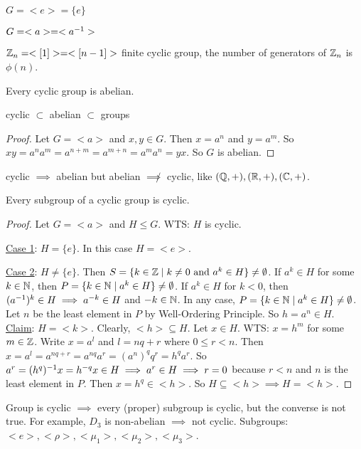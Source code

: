 \documentclass[]{article}
\begin{document}
\begin{example}
	$G = <e> = \{e\}$
\end{example}
\begin{remark}
	$G = <a> = <a^{-1} >$
\end{remark}
\begin{example}
	$\mathbb{Z}_n = <[1]> = <[n-1]>$ finite cyclic group, the number of generators of $\mathbb{Z}_n$ is $\phi(n)$.
\end{example}
\begin{proposition}
	Every cyclic group is abelian.
\end{proposition}
\begin{note}
	cyclic $\subset$ abelian $\subset$ groups
\end{note}
\begin{proof}
	Let $G = <a>$ and $x,y\in G$. Then $x = a^n$ and $y = a^m$. So $xy = a^na^m = a^{n+m} = a^{m+n} = a^ma^n = yx$. So $G$ is abelian.
\end{proof}
\begin{remark}
	cyclic $\implies$ abelian but abelian $\not\implies$ cyclic, like $(\mathbb{Q},+),(\mathbb{R},+), (\mathbb{C},+)$.
\end{remark}

\begin{theorem}
	Every subgroup of a cyclic group is cyclic.
\end{theorem}
\begin{proof}
	Let $G = <a>$ and $H\leq G$.
	WTS: $H$ is cyclic.
	
	\ul{Case 1}: $H = \{e\}$. In this case $H = <e>$.

	\ul{Case 2}: $H\neq \{e\}$.
	Then $S = \{k\in \mathbb{Z}\mid k \neq 0 \text{ and } a^k\in H\}\neq \emptyset$.
	If $a^k\in H$ for some $k\in\mathbb{N}$, then $P = \{k\in\mathbb{N}\mid a^k\in H\}\neq\emptyset$.
	If $a^k\in H$ for $k<0$, then $(a^{-1})^k\in H\implies a^{-k}\in H$ and $-k\in\mathbb{N}$.
	In any case, $P = \{k\in\mathbb{N}\mid a^k\in H\}\neq \emptyset$.
	Let $n$ be the least element in $P$ by Well-Ordering Principle.
	So $h = a^n\in H$. \ul{Claim}: $H = <k>$.
	Clearly, $<h>\subseteq H$. Let $x\in H$. WTS: $x = h^m$ for some $m\in\mathbb{Z}$.
	Write $x = a^l$ and $l = nq + r$ where $0\leq r<n$. Then $x = a^l = a^{nq+r} = a^{nq} a^r = (a^n)^qq^r = h^qa^r$. So $a^r = (h^q)^{-1} x = h^{-q}x\in H \implies a^r\in H \implies r = 0$ because $r<n$ and $n$ is the least element in $P$.
	Then $x = h^q \in <h>$. So $H\subseteq<h> \implies H = <h>$.
\end{proof}

Group is cyclic $\implies$ every (proper) subgroup is cyclic, but the converse is not true. For example, $D_3$ is non-abelian $\implies$ not cyclic. Subgroups: $<e>,<\rho>,<\mu_1>,<\mu_2>,<\mu_3>$.
\end{document}
